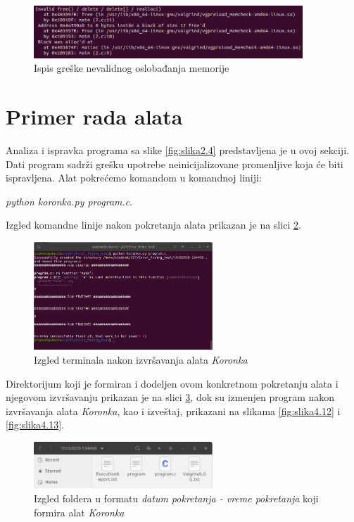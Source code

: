 \documentclass[12pt,oneside]{memoir}
\theoremstyle{plain}
\theoremstyle{definition}
\begin{document}
\begin{figure}[!ht]
  \centering
  \includegraphics[width=0.9\textwidth]{InvalidFreeErrorPartOfResume.png}
  \caption{Ispis greške nevalidnog oslobađanja memorije}
  \label{fig:slika4.9}
\end{figure} 

\section{Primer rada alata}
Analiza i ispravka programa sa slike \ref{fig:slika2.4} predstavljena je u ovoj sekciji. Dati program sadrži grešku upotrebe neinicijalizovane promenljive koja će biti ispravljena. Alat pokrećemo komandom u komandnoj liniji:
\begin{center}
\textit{python koronka.py program.c}.
\end{center}

Izgled komandne linije nakon pokretanja alata prikazan je na slici \ref{fig:slika4.10}. 
\begin{figure}[!ht]
  \centering
  \includegraphics[width=0.6\textwidth]{TerminalOutput.png}
  \caption{Izgled terminala nakon izvršavanja alata \textit{Koronka}}
  \label{fig:slika4.10}
\end{figure}

Direktorijum koji je formiran i dodeljen ovom konkretnom pokretanju alata i njegovom izvršavanju prikazan je na slici \ref{fig:slika4.11}, dok su izmenjen program nakon izvršavanja alata \textit{Koronka}, kao i izveštaj, prikazani na slikama \ref{fig:slika4.12} i \ref{fig:slika4.13}.
\begin{figure}[!ht]
  \centering
  \includegraphics[width=0.6\textwidth]{DateTimeFolder.png}
  \caption{Izgled foldera u formatu \textit{datum pokretanja - vreme pokretanja} koji formira alat \textit{Koronka}}
  \label{fig:slika4.11}
\end{figure}
\end{document}
